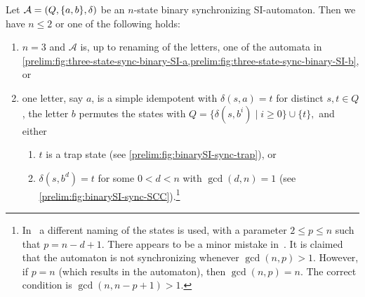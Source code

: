 \begin{proposition} \label{prop:structure_simp_idem_binary}
	Let $\mathcal A = (Q, \{a,b\}, \delta)$ be an $n$-state binary synchronizing SI-automaton.
	Then we have $n \le 2$ or one of the following holds:
	\begin{enumerate}
		\item $n = 3$ and $\mathcal A$ is, up to renaming of the letters, one of the automata in \cref{prelim:fig:three-state-sync-binary-SI-a,prelim:fig:three-state-sync-binary-SI-b}, or
		\item one letter, say $a$, is a simple idempotent with $\delta(s,a)=t$ for distinct
		$s,t\in Q$, the letter $b$ permutes the states with
		$
		Q=\{\delta(s,b^i)\mid i\ge0\}\cup\{t\},
		$
		and either
		\begin{enumerate}
			\item $t$ is a trap state (see \cref{prelim:fig:binarySI-sync-trap}), or
			\item $\delta(s,b^d)=t$ for some $0<d<n$ with $\gcd(d,n)=1$
			(see \cref{prelim:fig:binarySI-sync-SCC}).\footnote{In~\cite[Prop.~6.2]{Mar2009b} a 
				different naming of the states is used,
				with a parameter $2\le p\le n$ such that $p=n-d+1$. There appears to be a minor
				mistake in~\cite[Prop.~6.2]{Mar2009b}. It is claimed that the 
				automaton is not synchronizing whenever
				$\gcd(n,p)>1$. However, if $p=n$ (which results in the \Cerny automaton),
				then $\gcd(n,p)=n$. The correct condition is
				$\gcd(n,n-p+1)>1$.}
		\end{enumerate}
	\end{enumerate}
\end{proposition}
